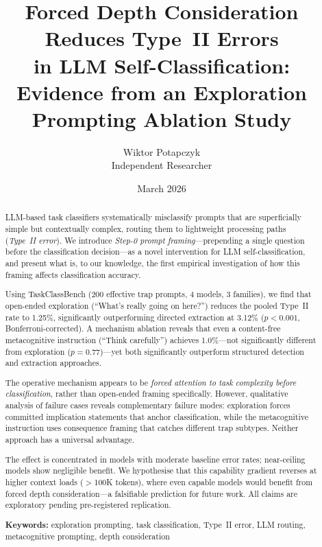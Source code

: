 \documentclass[11pt,a4paper]{article}
\title{\textbf{Forced Depth Consideration Reduces Type~II Errors\\
in LLM Self-Classification:\\
Evidence from an Exploration Prompting Ablation Study}}
\author{Wiktor Potapczyk\\
\small Independent Researcher\\
}
\date{March 2026}
\begin{document}
\maketitle

\begin{abstract}
LLM-based task classifiers systematically misclassify prompts that are
superficially simple but contextually complex, routing them to lightweight
processing paths (\emph{Type~II error}).  We introduce \emph{Step-0 prompt
framing}---prepending a single question before the classification
decision---as a novel intervention for LLM self-classification, and
present what is, to our knowledge, the first empirical investigation of
how this framing affects classification accuracy.

Using TaskClassBench (200 effective trap prompts, 4 models, 3 families),
we find that open-ended exploration (``What's really going on here?'')
reduces the pooled Type~II rate to 1.25\%, significantly outperforming
directed extraction at 3.12\% ($p < 0.001$, Bonferroni-corrected).
A mechanism ablation reveals that even a content-free metacognitive
instruction (``Think carefully'') achieves 1.0\%---not significantly
different from exploration ($p = 0.77$)---yet both significantly
outperform structured detection and extraction approaches.

The operative mechanism appears to be \emph{forced attention to task
complexity before classification}, rather than open-ended framing
specifically.  However, qualitative analysis of failure cases reveals
complementary failure modes: exploration forces committed implication
statements that anchor classification, while the metacognitive instruction
uses consequence framing that catches different trap subtypes.  Neither
approach has a universal advantage.

The effect is concentrated in models with moderate baseline error rates;
near-ceiling models show negligible benefit.  We hypothesise that this
capability gradient reverses at higher context loads ($>$100K tokens),
where even capable models would benefit from forced depth
consideration---a falsifiable prediction for future work.  All claims
are exploratory pending pre-registered replication.

\noindent\textbf{Keywords:} exploration prompting, task classification,
Type~II error, LLM routing, metacognitive prompting, depth consideration
\end{abstract}
\end{document}
